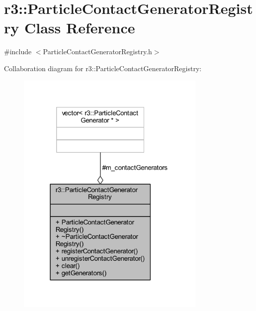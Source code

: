 \hypertarget{classr3_1_1_particle_contact_generator_registry}{}\section{r3\+:\+:Particle\+Contact\+Generator\+Registry Class Reference}
\label{classr3_1_1_particle_contact_generator_registry}


{\ttfamily \#include $<$Particle\+Contact\+Generator\+Registry.\+h$>$}



Collaboration diagram for r3\+:\+:Particle\+Contact\+Generator\+Registry\+:\nopagebreak
\begin{figure}[H]
\begin{center}
\leavevmode
\includegraphics[width=259pt]{classr3_1_1_particle_contact_generator_registry__coll__graph}
\end{center}
\end{figure}
